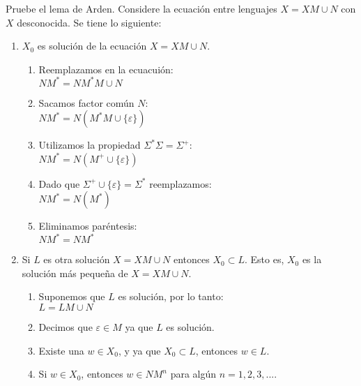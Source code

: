 \documentclass[a4paper, 12pt]{article}
\begin{document}
Pruebe el lema de Arden. Considere la ecuación entre lenguajes $X = XM \cup N$ con $X$ desconocida. Se tiene lo siguiente:
\begin{enumerate}
    \item $X_{0}$ es solución de la ecuación $X = XM \cup N$.
    \begin{enumerate}[label = -]
                    \item Reemplazamos en la ecuacuión:
                    \\ $NM^{*} = NM^{*}M \cup N$

                    \item Sacamos factor común $N$:
                    \\ $NM^* = N(M^{*}M \cup \{ \varepsilon \})$

                    \item Utilizamos la propiedad $\Sigma^{*}\Sigma = \Sigma^{+}$:
                    \\ $NM^{*} = N(M^{+} \cup \{ \varepsilon \})$

                    \item Dado que $\Sigma^{+} \cup \{ \varepsilon \} = \Sigma^{*}$ reemplazamos:
                    \\ $NM^{*} = N(M^{*})$

                    \item Eliminamos paréntesis:
                    \\ $NM^{*} = NM^{*}$
                \end{enumerate}

    \vspace{0.5cm}
    \item Si $L$ es otra solución $X = XM \cup N$ entonces $X_{0} \subset L$. Esto es, $X_{0}$ es la solución más pequeña de $X = XM \cup N$.
    \begin{enumerate}[label = -]
        \item Suponemos que $L$ es solución, por lo tanto:
        \\ $L = LM \cup N$

        \item Decimos que $\varepsilon \in M$ ya que $L$ es solución.

        \item Existe una $w \in X_{0}$, y ya que $X_{0} \subset L$, entonces $w \in L$.

        \item Si $w \in X_0$, entonces $w \in NM^{n}$ para algún $n = 1, 2, 3, ...$.


\end{enumerate}
\end{enumerate}
\end{document}
